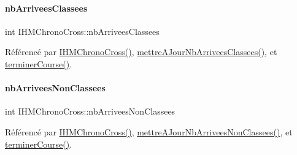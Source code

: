 \mbox{\label{class_i_h_m_chrono_cross_a9bdcd0e57b79f64957eefea0f9d2b097}} 
\paragraph{\texorpdfstring{nb\+Arrivees\+Classees}{nbArriveesClassees}}
{\footnotesize\ttfamily int I\+H\+M\+Chrono\+Cross\+::nb\+Arrivees\+Classees\hspace{0.3cm}{\ttfamily [private]}}



Référencé par \hyperlink{class_i_h_m_chrono_cross_a479fc90733fba3e65fb06aa4a3adc02e}{I\+H\+M\+Chrono\+Cross()}, \hyperlink{class_i_h_m_chrono_cross_a3d786cb4b5c5e3a4bd566f19409601d5}{mettre\+A\+Jour\+Nb\+Arrivees\+Classees()}, et \hyperlink{class_i_h_m_chrono_cross_ac89c6ec3040e8b787f1fbdb670405023}{terminer\+Course()}.

\mbox{\label{class_i_h_m_chrono_cross_aa3198d36b0574b477a328621c8e1e0f0}} 
\paragraph{\texorpdfstring{nb\+Arrivees\+Non\+Classees}{nbArriveesNonClassees}}
{\footnotesize\ttfamily int I\+H\+M\+Chrono\+Cross\+::nb\+Arrivees\+Non\+Classees\hspace{0.3cm}{\ttfamily [private]}}



Référencé par \hyperlink{class_i_h_m_chrono_cross_a479fc90733fba3e65fb06aa4a3adc02e}{I\+H\+M\+Chrono\+Cross()}, \hyperlink{class_i_h_m_chrono_cross_a1b23fda62742f2dd17652d3abcb33dd6}{mettre\+A\+Jour\+Nb\+Arrivees\+Non\+Classees()}, et \hyperlink{class_i_h_m_chrono_cross_ac89c6ec3040e8b787f1fbdb670405023}{terminer\+Course()}.

\mbox{\label{class_i_h_m_chrono_cross_aba349505e99e6e320b218ba2b7fb485e}} 
